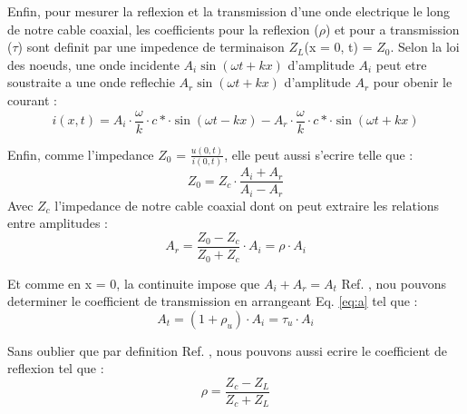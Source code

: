 Enfin, pour mesurer la reflexion et la transmission d'une onde electrique le long de notre cable coaxial, les coefficients pour la reflexion ($\rho$) et pour a transmission ($\tau$) sont definit par une impedence de terminaison $Z_L$(x = 0, t) = $Z_0$. Selon la loi des noeuds, une onde incidente $A_i\sin(\omega t + kx)$ d'amplitude $A_i$ peut etre soustraite a une onde reflechie $A_r\sin(\omega t + kx)$ d'amplitude $A_r$ pour obenir le courant :
\begin{equation}
	i(x,t) = A_i \cdot \frac{\omega}{k} \cdot c* \cdot \sin(\omega t - kx) - A_r \cdot \frac{\omega}{k} \cdot c* \cdot \sin(\omega t + kx)
	\label{eq:current}
\end{equation}

Enfin, comme l'impedance $Z_0$ = $\frac{u(0, t)}{i(0, t)}$, elle peut aussi s'ecrire telle que :
\begin{equation}
	Z_0 = Z_c \cdot \frac{A_i + A_r}{A_i - A_r}
	\label{eq:z0}
\end{equation}
Avec $Z_c$ l'impedance de notre cable coaxial dont on peut extraire les relations entre amplitudes :
\begin{equation}
	A_r = \frac{Z_0 - Z_c}{Z_0 + Z_c} \cdot A_i = \rho \cdot A_i
	\label{eq:a}
\end{equation}

Et comme en x = 0, la continuite impose que $A_i + A_r = A_t$ Ref. \cite{protocole}, nou pouvons determiner le coefficient de transmission en arrangeant Eq. \ref{eq:a} tel que :
\begin{equation}
	A_t = (1 + \rho_u) \cdot A_i = \tau_u \cdot A_i
	\label{eq:tau}
\end{equation}

Sans oublier que par definition Ref. \cite{protocole}, nous pouvons aussi ecrire le coefficient de reflexion tel que :
\begin{equation}
	\rho = \frac{Z_c - Z_L}{Z_c + Z_L}
	\label{eq:reflexion1}
\end{equation}
